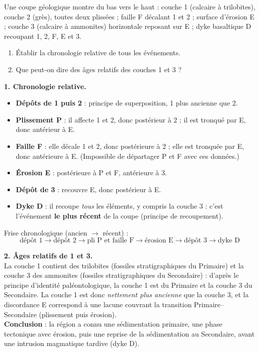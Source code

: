 \documentclass[11pt]{article}
\newcommand{\cle}[1]{{\popxbold\color{popdark}#1}}
\begin{document}
\begin{exoresolu}
Une coupe géologique montre du bas vers le haut : couche 1 (calcaire à trilobites), couche 2 (grès), toutes deux plissées ; faille F décalant 1 et 2 ; surface d'érosion E ; couche 3 (calcaire à ammonites) horizontale reposant sur E ; dyke basaltique D recoupant 1, 2, F, E et 3.
\begin{enumerate}
\item Établir la chronologie relative de tous les événements.
\item Que peut-on dire des âges relatifs des couches 1 et 3 ?
\end{enumerate}
\tcblower
\textbf{1. Chronologie relative.}
\begin{itemize}
\item \textbf{Dépôts de 1 puis 2} : principe de superposition, 1 plus ancienne que 2.
\item \textbf{Plissement P} : il affecte 1 et 2, donc postérieur à 2 ; il est tronqué par E, donc antérieur à E.
\item \textbf{Faille F} : elle décale 1 et 2, donc postérieure à 2 ; elle est tronquée par E, donc antérieure à E. (Impossible de départager P et F avec ces données.)
\item \textbf{Érosion E} : postérieure à P et F, antérieure à 3.
\item \textbf{Dépôt de 3} : recouvre E, donc postérieur à E.
\item \textbf{Dyke D} : il recoupe \emph{tous} les éléments, y compris la couche 3 : c'est l'événement \textbf{le plus récent} de la coupe (principe de recoupement).
\end{itemize}
Frise chronologique (ancien $\rightarrow$ récent) :
\[ \text{dépôt 1} \rightarrow \text{dépôt 2} \rightarrow \text{pli P et faille F} \rightarrow \text{érosion E} \rightarrow \text{dépôt 3} \rightarrow \text{dyke D} \]

\textbf{2. Âges relatifs de 1 et 3.}\\
La couche 1 contient des trilobites (fossiles stratigraphiques du Primaire) et la couche 3 des ammonites (fossiles stratigraphiques du Secondaire) : d'après le \cle{principe d'identité paléontologique}, la couche 1 est du Primaire et la couche 3 du Secondaire. La couche 1 est donc \emph{nettement plus ancienne} que la couche 3, et la discordance E correspond à une lacune couvrant la transition Primaire--Secondaire (plissement puis érosion).\\
\textbf{Conclusion} : la région a connu une sédimentation primaire, une phase tectonique avec érosion, puis une reprise de la sédimentation au Secondaire, avant une intrusion magmatique tardive (dyke D).
\end{exoresolu}
\end{document}
